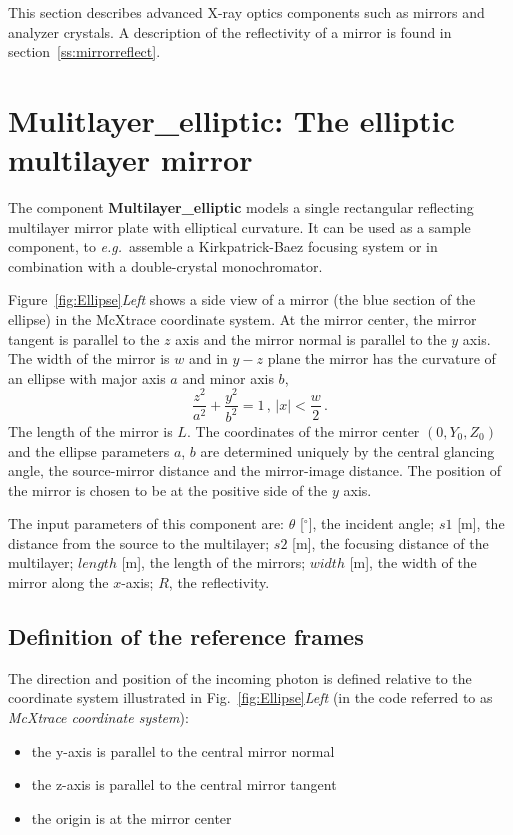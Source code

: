 

This section describes advanced X-ray optics
components such as mirrors and analyzer crystals.
A description of the reflectivity of a mirror is found
in section~\ref{ss:mirrorreflect}.

\section{Mulitlayer\_elliptic: The elliptic multilayer mirror}
\label{s:mirror}

The component {\bf Multilayer\_elliptic}
models a single rectangular reflecting multilayer mirror plate with elliptical curvature. It can be used
as a sample component, to \textit{e.g.}~assemble a Kirkpatrick-Baez focusing system 
or in combination with a double-crystal monochromator.


Figure~\ref{fig:Ellipse}\emph{Left} shows a side view of a mirror
(the blue section of the ellipse) in the McXtrace coordinate system.
At the mirror center, the mirror tangent is parallel to the $z$ axis
and the mirror normal is parallel to the $y$ axis. The width of the
mirror is $w$ and in $y-z$ plane the mirror has the curvature of an
ellipse with major axis $a$ and minor axis $b$,
%
\begin{equation} 
\frac{z^2}{ a^2} + \frac{y^2}{b^2} =1\,, \,|x| <
\frac{w}{2}\,.
\end{equation}
%
The length of the mirror is $L$. The coordinates of the mirror
center $(0,Y_0,Z_0)$ and the ellipse parameters $a$, $b$ are
determined uniquely by the central glancing angle, the source-mirror
distance and the mirror-image distance. The position of the mirror
is chosen to be at the positive side of the $y$ axis.

The input parameters of this component are:
$\theta$ [$^{\circ}$], the incident angle; 
$s1$ [m], the distance from the source to the multilayer;
$s2$ [m], the focusing distance of the multilayer;
$length$ [m], the length of the mirrors;
$width$ [m], the width of the mirror along the $x$-axis;
$R$, the reflectivity.

\subsection{Definition of the reference frames}
The direction and position of the incoming photon is defined
relative to the coordinate system illustrated in
Fig.~\ref{fig:Ellipse}\emph{Left} (in the code referred to as
\emph{McXtrace coordinate system}):
\begin{itemize}
\item the y-axis is parallel to the central mirror normal
\item the z-axis is parallel to the central mirror tangent
\item the origin is at the mirror center
\end{itemize}

